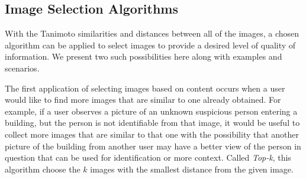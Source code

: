 %
%
%

\subsection{Image Selection Algorithms}

With the Tanimoto similarities and distances between all of the images, a chosen algorithm can be applied to select images to provide a desired level of quality of information.  We present two such possibilities here along with examples and scenarios.

The first application of selecting images based on content occurs when a user would like to find more images that are similar to one already obtained.  For example, if a user observes a picture of an unknown suspicious person entering a building, but the person is not identifiable from that image, it would be useful to collect more images that are similar to that one with the possibility that another picture of the building from another user may have a better view of the person in question that can be used for identification or more context.  Called \emph{Top-k}, this algorithm choose the $k$ images with the smallest distance from the given image.  

